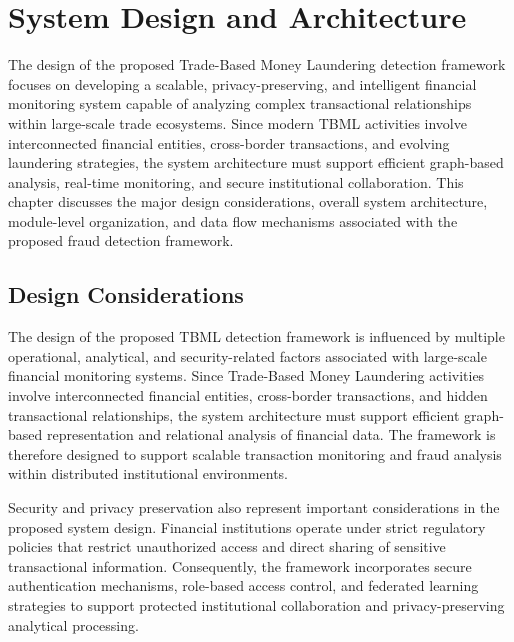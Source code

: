 \chapter{System Design and Architecture}
The design of the proposed Trade-Based Money Laundering detection framework focuses on developing a scalable, privacy-preserving, and intelligent financial monitoring system capable of analyzing complex transactional relationships within large-scale trade ecosystems. Since modern TBML activities involve interconnected financial entities, cross-border transactions, and evolving laundering strategies, the system architecture must support efficient graph-based analysis, real-time monitoring, and secure institutional collaboration. This chapter discusses the major design considerations, overall system architecture, module-level organization, and data flow mechanisms associated with the proposed fraud detection framework.

\section[Design Considerations]{\textbf{Design Considerations}}

The design of the proposed TBML detection framework is influenced by multiple operational, analytical, and security-related factors associated with large-scale financial monitoring systems. Since Trade-Based Money Laundering activities involve interconnected financial entities, cross-border transactions, and hidden transactional relationships, the system architecture must support efficient graph-based representation and relational analysis of financial data. The framework is therefore designed to support scalable transaction monitoring and fraud analysis within distributed institutional environments.

Security and privacy preservation also represent important considerations in the proposed system design. Financial institutions operate under strict regulatory policies that restrict unauthorized access and direct sharing of sensitive transactional information. Consequently, the framework incorporates secure authentication mechanisms, role-based access control, and federated learning strategies to support protected institutional collaboration and privacy-preserving analytical processing.

